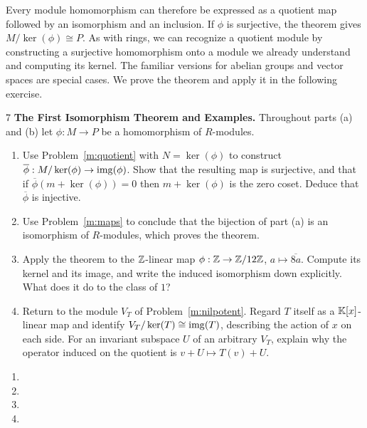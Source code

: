 \documentclass[Notebook.tex]{subfiles}
\begin{document}
Every module homomorphism can therefore be expressed as a quotient map followed by an isomorphism and an inclusion. If $\phi$ is surjective, the theorem gives $M/\ker(\phi)\cong P$. As with rings, we can recognize a quotient module by constructing a surjective homomorphism onto a module we already understand and computing its kernel. The familiar versions for abelian groups and vector spaces are special cases. We prove the theorem and apply it in the following exercise.

\hrulefill

\begin{problem}{7}\label{m:fit}
	\textbf{The First Isomorphism Theorem and Examples.} Throughout parts (a) and (b) let $\phi:M\to P$ be a homomorphism of $R$-modules.
	\begin{enumerate}[label=(\alph*),ref=\theenumi\alph*]
		\item Use Problem~\ref{m:quotient} with $N=\ker(\phi)$ to construct $\overline{\phi}:M/\ker(\phi)\to\operatorname{img}(\phi)$. Show that the resulting map is surjective, and that if $\overline{\phi}(m+\ker(\phi))=0$ then $m+\ker(\phi)$ is the zero coset. Deduce that $\overline{\phi}$ is injective.
		\item Use Problem~\ref{m:maps} to conclude that the bijection of part (a) is an isomorphism of $R$-modules, which proves the theorem.
		\item Apply the theorem to the $\mathbb Z$-linear map $\phi:\mathbb Z\to\mathbb Z/12\mathbb Z$, $a\mapsto\overline{8a}$. Compute its kernel and its image, and write the induced isomorphism down explicitly. What does it do to the class of $1$?
		\item Return to the module $V_T$ of Problem~\ref{m:nilpotent}. Regard $T$ itself as a $\mathbb K[x]$-linear map and identify $V_T/\ker(T)\cong\operatorname{img}(T)$, describing the action of $x$ on each side. For an invariant subspace $U$ of an arbitrary $V_T$, explain why the operator induced on the quotient is $v+U\mapsto T(v)+U$.
	\end{enumerate}
\end{problem}

\begin{solution}
	\bbni
	\begin{enumerate}[label=(\alph*),ref=\theenumi\alph*]
		\item
		\item
		\item
		\item
	\end{enumerate}
\end{solution}
\end{document}
